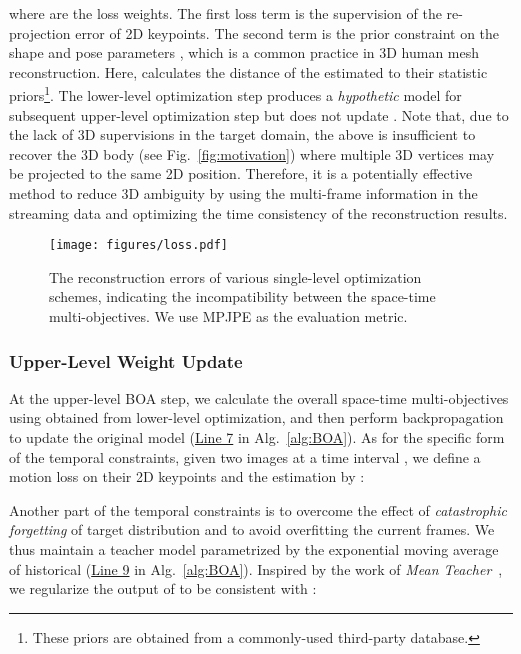 \documentclass[10pt,journal,compsoc]{IEEEtran}
\let\MYoriglatexcaption\caption
\renewcommand{\caption}[2][\relax]{\MYoriglatexcaption[#2]{#2}}
\newcommand{\fig}[1]{Fig.~\ref{#1}}
\newcommand{\alg}[1]{Alg.~\ref{#1}}
\begin{document}
where  are the loss weights. The first loss term is the supervision of the re-projection error of 2D keypoints. The second term is the prior constraint on the shape and pose parameters , which is a common practice in 3D human mesh reconstruction. Here,  calculates the distance of the estimated  to their statistic priors\footnote{These priors are obtained from a commonly-used third-party database.}. 
The lower-level optimization step produces a \textit{hypothetic} model  for subsequent upper-level optimization step but does not update . 
Note that, due to the lack of 3D supervisions in the target domain, the above  is insufficient to recover the 3D body (see \fig{fig:motivation}) where multiple 3D vertices may be projected to the same 2D position. 
Therefore, it is a potentially effective method to reduce 3D ambiguity by using the multi-frame information in the streaming data and optimizing the time consistency of the reconstruction results.


\begin{figure}[t]
    \centering
    \texttt{[image: figures/loss.pdf]}
    \vspace{-10pt}
    \caption{The reconstruction errors of various single-level optimization schemes, indicating the incompatibility between the space-time multi-objectives. 
We use MPJPE as the evaluation metric.
    }
    \label{fig:loss_converge_compare}
\end{figure}


\subsubsection{Upper-Level Weight Update}
At the upper-level BOA step, we calculate the overall space-time multi-objectives using  obtained from lower-level optimization, and then perform backpropagation to update the original model  (\underline{Line 7} in \alg{alg:BOA}).
As for the specific form of the temporal constraints, given two images  at a time interval , we define a motion loss on their 2D keypoints  and the estimation  by :

Another part of the temporal constraints is to overcome the effect of \textit{catastrophic forgetting} of target distribution and to avoid overfitting the current frames. We thus maintain a teacher model  parametrized by the exponential moving average of historical  (\underline{Line 9} in \alg{alg:BOA}).
Inspired by the work of \textit{Mean Teacher}~\cite{tarvainen2017mean}, we regularize the output of  to be consistent with : 
\end{document}
